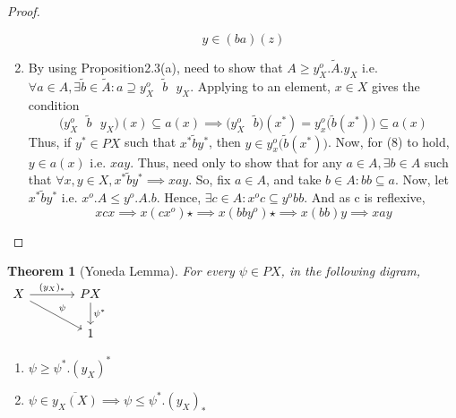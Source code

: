 \documentclass[18pt,a4paper]{article}
\newtheorem{theorem}{Theorem}[section]
\theoremstyle{definition}
\begin{document}
\begin{proof}
\begin{enumerate}[label=(\alph*)]
\[		y \in (ba)(z)\]
	\item By using Proposition2.3(a), need to show that $A\geq y_X^o.\tilde{A}.y_X$ i.e. $\forall
		a\in A, \exists \tilde{b}\in \tilde{A} :  a \supseteq y_X^o \text{ } \tilde{b} \text{ } y_X $.
		Applying to an element, $x\in X$ gives the condition
		\begin{equation}
			\Big( y_X^o \text{ } \tilde{b} \text{ } y_X \Big)(x) \subseteq a(x)
			\implies \Big( y_X^o \text{ } \tilde{b} \Big) (x^*)= y_x^o
			\Big(\tilde{b}(x^*)\Big) \subseteq a(x)
		\end{equation}
		Thus, if $y^* \in PX$ such that $x^* \tilde{b} y^*$, then
		$y \in y_x^o\Big(\tilde{b}(x^*)\Big)$. Now, for (8) to hold, $y \in a(x)$ i.e. $xay$. Thus,
		need only to show that for any $a\in A, \exists b \in A $ such that $\forall x,y \in X,
		x^* \tilde{b}y^* \implies xay $. So, fix $a\in A$, and take $b \in A: bb \subseteq a$.
		Now, let $x^* \tilde{b}y^*$ i.e. $x^o.A \leq y^o .A .b$.
		Hence, $\exists c \in A: x^oc \subseteq y^o bb$. And as c is reflexive,
		\[ xcx \implies x(cx^o)\star \implies x(bby^o)\star \implies x(bb)y \implies xay \]




\end{enumerate}
\end{proof}
\begin{theorem}[Yoneda Lemma] %
	For every $\psi \in PX$, in the following digram,
	$\begin{tikzcd}[column sep=large ]
		X \arrow{r}{(y_X)_*}  \arrow{rd}{\psi}
  & PX \arrow{d}{\psi^*} \\
  & 1
	\end{tikzcd}$
	\begin{enumerate}[label=(\alph*)]
		\item $\psi \geq \psi^*.(y_X)^*$
		\item $\psi \in \overline{y_X(X)} \implies \psi \leq \psi^*.(y_X)_*$
	\end{enumerate}
\end{theorem}
\end{document}
